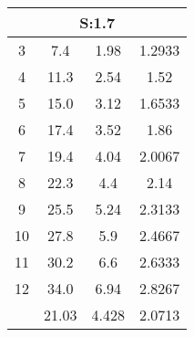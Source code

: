 
\begin{table}[H]
\begin{tabular}{c|ccc}
\multicolumn{4}{c}{S:1.7}\\\hline
3 & 7.4 & 1.98 & 1.2933\\
4 & 11.3 & 2.54 & 1.52\\
5 & 15.0 & 3.12 & 1.6533\\
6 & 17.4 & 3.52 & 1.86\\
7 & 19.4 & 4.04 & 2.0067\\
8 & 22.3 & 4.4 & 2.14\\
9 & 25.5 & 5.24 & 2.3133\\
10 & 27.8 & 5.9 & 2.4667\\
11 & 30.2 & 6.6 & 2.6333\\
12 & 34.0 & 6.94 & 2.8267\\
\hline
& 21.03 & 4.428 & 2.0713\\
\end{tabular}
\end{table}